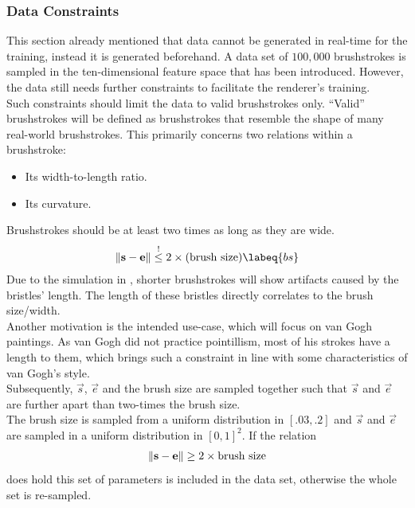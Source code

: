 \subsubsection{Data Constraints}
This section already mentioned that data cannot be generated in real-time for the training, instead it is generated beforehand.
A data set of $100,000$ brushstrokes is sampled in the ten-dimensional feature space that has been introduced.
However, the data still needs further constraints to facilitate the renderer's training.\\
Such constraints should limit the data to valid brushstrokes only.
``Valid'' brushstrokes will be defined as brushstrokes that resemble the shape of many real-world brushstrokes.
This primarily concerns two relations within a brushstroke:
\begin{itemize}
    \item Its width-to-length ratio.
    \item Its curvature.
\end{itemize}

Brushstrokes should be at least two times as long as they are wide.
\begin{align}
    \norm{\vec{s} - \vec{e}} \overset{!}{\leq}  2 \times (\text{brush size}) \labeq{bs}
\end{align}
Due to the simulation in , shorter brushstrokes will show artifacts caused by the bristles' length.
The length of these bristles directly correlates to the brush size/width.\\
Another motivation is the intended use-case, which will focus on van Gogh paintings.
As van Gogh did not practice pointillism, most of his strokes have a length to them, which brings such a constraint in line with some characteristics of van Gogh's style.\\
Subsequently, $\vec{s}$, $\vec{e}$ and the brush size are sampled together such that $\vec{s}$ and $\vec{e}$ are further apart than two-times the brush size.\\
The brush size is sampled from a uniform distribution in $[.03, .2]$ and $\vec{s}$ and $\vec{e}$ are sampled in a uniform distribution in $[0, 1]^2$.
If the relation
\begin{align}
    \left\lVert\mathbf{s} - \mathbf{e}\right\rVert \geq 2 \times \text{brush size}
\end{align}
does hold this set of parameters is included in the data set, otherwise the whole set is re-sampled.

